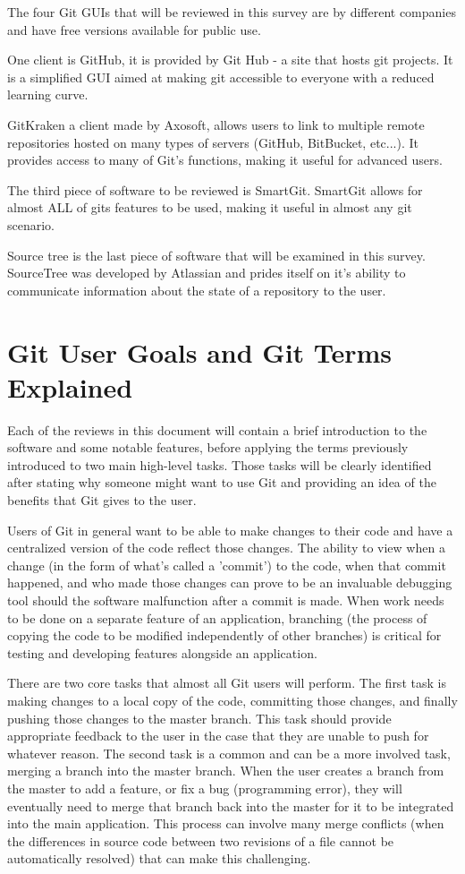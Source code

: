 \documentclass{sigchi}
\begin{document}
The four Git GUIs that will be reviewed in this survey are by different companies and have
free versions available for public use. 

One client is GitHub, it is provided by Git Hub - a site that hosts git projects. It is a simplified GUI aimed at making git accessible to everyone
with a  reduced learning curve.

 GitKraken a client made by Axosoft, allows users to link to multiple remote repositories hosted on many types of servers (GitHub, BitBucket, etc...).
It provides access to many of Git's functions, making it useful for advanced users.

The third piece of software to be reviewed is SmartGit. SmartGit allows for almost ALL of gits
features to be used, making it useful in almost any git scenario. 

Source tree is the last piece of software that will be examined in this survey. SourceTree was developed by Atlassian and
prides itself on it's ability to communicate information about the state of a repository to the user.

\section{Git User Goals and Git Terms Explained}
Each of the reviews in this document will contain a brief introduction to the software and some notable features, before applying 
the terms previously introduced to two main high-level tasks. Those tasks will be clearly identified 
after stating why someone might want to use Git and providing an idea of the benefits that Git gives to the user.

Users of Git in general want to be able to make changes to their code and have a centralized version of the code reflect those changes. 
The ability to view when a change (in the form of what's called a 'commit') to the code, when that
commit happened, and who made those changes can prove to be an invaluable debugging tool
should the software malfunction after a commit is made. When work needs to be done on a 
separate feature of an application, branching (the process of copying the code to be modified
independently of other branches) is critical for testing and developing features alongside an application.

There are two core tasks that almost all Git users will perform. The first task is making changes to a local copy of the code,
committing those changes, and finally pushing those changes to the master branch. This task should 
provide appropriate feedback to the user in the case that they are unable to push for whatever reason.
The second task is a common and can be a more involved task, merging a branch into the master branch. 
When the user creates a branch from the master to add a feature, or fix a bug (programming error), they
will eventually need to merge that branch back into the master for it to be integrated into the main application. 
This process can involve many merge conflicts (when the differences in source code between two revisions of
a file cannot be automatically resolved) that can make this challenging.
\end{document}

